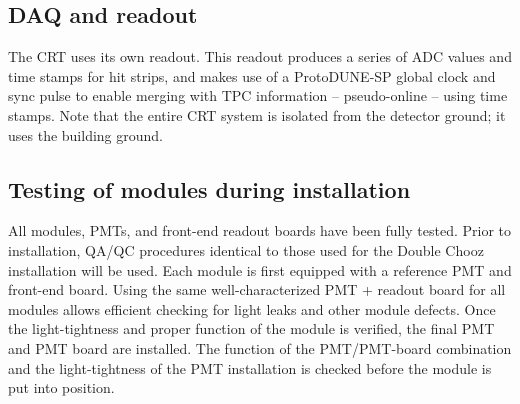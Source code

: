 

\subsection{DAQ and readout}

The CRT uses its own readout. This readout produces a series of ADC values and time stamps for hit strips, and makes use of a ProtoDUNE-SP global clock and sync pulse to enable merging with TPC information -- pseudo-online -- using time stamps. Note that the entire CRT system is isolated from the detector ground; it uses the building ground.

\subsection{Testing of modules during installation}

All modules, PMTs, and front-end readout boards have been fully tested. Prior to installation, QA/QC procedures identical to those used for the Double Chooz installation will be used. Each module is first equipped with a reference PMT and front-end board. Using the same well-characterized PMT + readout board for all modules allows efficient checking for light leaks and other module defects. Once the light-tightness and proper function of the module is verified, the final PMT and PMT board are installed. The function of the PMT/PMT-board combination and the light-tightness of the PMT installation is checked before the module is put into position.
